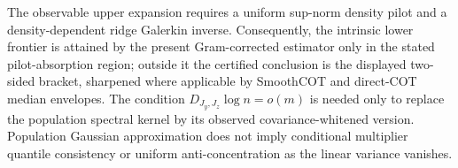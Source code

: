The observable upper expansion requires a uniform sup-norm density pilot and a density-dependent ridge Galerkin inverse. Consequently, the intrinsic lower frontier is attained by the present Gram-corrected estimator only in the stated pilot-absorption region; outside it the certified conclusion is the displayed two-sided bracket, sharpened where applicable by SmoothCOT and direct-COT median envelopes. The condition \(D_{J_y,J_z}\log n=o(m)\) is needed only to replace the population spectral kernel by its observed covariance-whitened version. Population Gaussian approximation does not imply conditional multiplier quantile consistency or uniform anti-concentration as the linear variance vanishes.